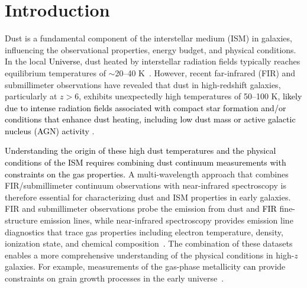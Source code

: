 \documentclass[trackchanges,twocolumn]{aastex701}
\newcommand{\ca}[1]{\textcolor{black}{#1}} %
\newcommand{\cc}[1]{\textcolor{black}{#1}} %
\newcommand{\cd}[1]{\textcolor{black}{#1}} %
\newcommand{\ckt}[1]{\textcolor{black}{#1}}
\begin{document}
\section{Introduction}
Dust is a fundamental component of the interstellar medium (ISM) in galaxies, influencing the observational properties, energy budget, and physical conditions. In the local \cd{Universe}, dust heated by interstellar radiation fields typically reaches equilibrium temperatures of $\sim$20--40 K~\ca{\citep{Dunne2000,Casey2012}}. However, recent far-infrared (FIR) and submillimeter observations have revealed that dust in high-redshift galaxies, particularly at $z > 6$, exhibits unexpectedly high temperatures of 50--100 K, \cc{likely due to intense radiation fields associated with compact star formation and/or conditions that enhance dust heating, including low dust mass or active galactic nucleus (AGN) activity} \citep{Nakazato2026,Viero2022,Sommovigo2022,Mitsuhashi2024,Tsukui2023}. 


\cc{Understanding the origin of these high dust temperatures and the physical conditions of the ISM requires combining dust continuum measurements with constraints on the gas properties.}
A multi-wavelength approach that combines FIR/submillimeter continuum observations with near-infrared spectroscopy is therefore essential for characterizing dust and ISM properties in early galaxies. FIR and submillimeter observations probe the emission from dust and \ckt{FIR} fine-structure emission lines, while near-infrared spectroscopy provides emission line diagnostics that trace gas properties including electron temperature, density, ionization state, and chemical composition~\cc{\citep{Osterbrock2006,Draine2011}.} The combination of these datasets enables a more comprehensive understanding of the physical conditions in high-$z$ galaxies. For example, measurements of the gas-phase metallicity \cd{can} provide constraints on grain growth processes in the early universe~\citep[\cc{e.g.,}][]{Asano2013, Popping2017,Toyouchi2025}.
\end{document}
